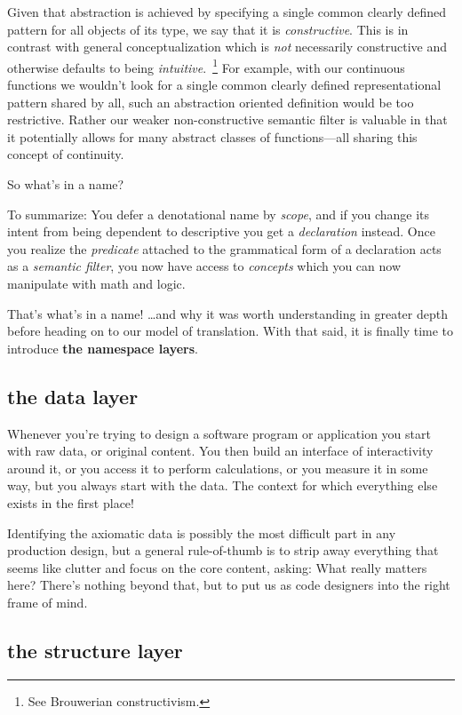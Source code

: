 \documentclass[twoside]{article}
\begin{document}
Given that abstraction is achieved by specifying a single common clearly defined pattern for all objects of its type,
we say that it is \emph{constructive}. This is in contrast with general conceptualization which is \emph{not} necessarily
constructive and otherwise defaults to being \emph{intuitive}.~\footnote{See Brouwerian constructivism.} For example,
with our continuous functions we wouldn't look for a single common clearly defined representational pattern shared by all,
such an abstraction oriented definition would be too restrictive. Rather our weaker non-constructive semantic filter
is valuable in that it potentially allows for many abstract classes of functions---all sharing this concept of continuity.

So what's in a name?

To summarize: You defer a denotational name by \emph{scope}, and if you change its intent from being dependent to descriptive
you get a \emph{declaration} instead. Once you realize the \emph{predicate} attached to the grammatical form of a declaration
acts as a \emph{semantic filter}, you now have access to \emph{concepts} which you can now manipulate with math and logic.

That's what's in a name! \ldots and why it was worth understanding in greater depth before heading
on to our model of translation. With that said, it is finally time to introduce {\bf the namespace layers}.

\subsection*{the data layer}

Whenever you're trying to design a software program or application you start with raw data, or original content.
You then build an interface of interactivity around it, or you access it to perform calculations, or you measure it
in some way, but you always start with the data. The context for which everything else exists in the first place!

Identifying the axiomatic data is possibly the most difficult part in any production design, but a general rule-of-thumb
is to strip away everything that seems like clutter and focus on the core content, asking: What really matters here?
There's nothing beyond that, but to put us as code designers into the right frame of mind.

\subsection*{the structure layer}
\end{document}
